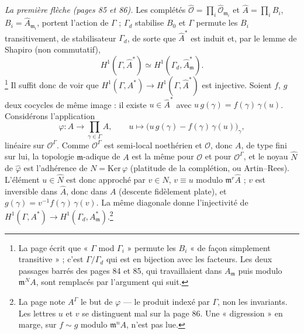 \documentclass[11pt,a4paper]{article}
\begin{document}
\emph{La première flèche (pages 85 et 86).} Les complétés $\hat{\mathcal{O}} =
\prod_i \hat{\mathcal{O}}_{\mathfrak{m}_i}$ et $\hat{A} = \prod_i B_i$, $B_i =
\hat{A}_{\mathfrak{m}_i}$, portent l'action de $\Gamma$ ; $\Gamma_d$ stabilise
$B_0$ et $\Gamma$ permute les $B_i$ transitivement, de stabilisateur $\Gamma_d$,
de sorte que $\hat{A}^{*}$ est induit et, par le lemme de Shapiro (non
commutatif),
\[
H^1(\Gamma, \hat{A}^{*}) \simeq H^1(\Gamma_d, \hat{A}_{\mathfrak{m}}^{*}).
\]
\footnote{La page écrit que « $\Gamma$ mod $\Gamma_i$ » permute les $B_i$ « de
façon simplement transitive » ; c'est $\Gamma/\Gamma_d$ qui est en bijection
avec les facteurs. Les deux passages barrés des pages 84 et 85, qui
travaillaient dans $A_{\mathfrak{m}}$ puis modulo $\mathfrak{m}^{N}A$, sont
remplacés par l'argument qui suit.} Il suffit donc de voir que $H^1(\Gamma,
A^{*}) \to H^1(\Gamma, \hat{A}^{*})$ est injective. Soient $f$, $g$ deux
cocycles de même image : il existe $u \in \hat{A}^{*}$ avec $u\,g(\gamma) =
f(\gamma)\,\gamma(u)$. Considérons l'application
\[
\varphi : A \longrightarrow \prod_{\gamma \in \Gamma} A, \qquad u \longmapsto
\bigl(u\,g(\gamma) - f(\gamma)\,\gamma(u)\bigr)_{\gamma},
\]
linéaire sur $\mathcal{O}^{\Gamma}$. Comme $\mathcal{O}^{\Gamma}$ est semi-local
noethérien et $\mathcal{O}$, donc $A$, de type fini sur lui, la topologie
$\mathfrak{m}$-adique de $A$ est la même pour $\mathcal{O}$ et pour
$\mathcal{O}^{\Gamma}$, et le noyau $\hat{N}$ de $\hat{\varphi}$ est l'adhérence
de $N = \mathrm{Ker}\,\varphi$ (platitude de la complétion, ou Artin–Rees).
L'élément $u \in \hat{N}$ est donc approché par $v \in N$, $v \equiv u$ modulo
$\mathfrak{m}^{r}\hat{A}$ ; $v$ est inversible dans $\hat{A}$, donc dans $A$
(descente fidèlement plate), et $g(\gamma) = v^{-1}f(\gamma)\,\gamma(v)$. La
même diagonale donne l'injectivité de $H^1(\Gamma, A^{*}) \to H^1(\Gamma_d,
A^{*}_{\mathfrak{m}})$.\footnote{La page note $A^{\Gamma}$ le but de $\varphi$
— le produit indexé par $\Gamma$, non les invariants. Les lettres $u$ et $v$
se distinguent mal sur la page 86. Une « digression » en marge, sur $f \sim
g$ modulo $\mathfrak{m}^{n}A$, n'est pas lue.}
\end{document}
